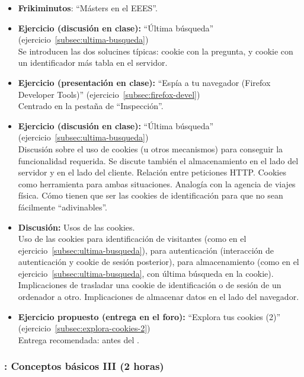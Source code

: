 \documentclass[a4paper,12pt]{article}
\begin{document}
\begin{itemize}
\item \textbf{Frikiminutos}: ``Másters en el EEES''.
\item \textbf{Ejercicio (discusión en clase):} ``Última búsqueda'' (ejercicio~\ref{subsec:ultima-busqueda}) \\
  Se introducen las dos solucines típicas: cookie con la pregunta, y cookie con un identificador más tabla en el servidor.
\item \textbf{Ejercicio (presentación en clase):} ``Espía a tu navegador (Firefox Developer Tools)'' (ejercicio~\ref{subsec:firefox-devel}) \\
  Centrado en la pestaña de ``Inspección''.
\item \textbf{Ejercicio (discusión en clase):} ``Última búsqueda'' (ejercicio~\ref{subsec:ultima-busqueda}) \\
  Discusión sobre el uso de cookies (u otros mecanismos) para conseguir la funcionalidad requerida. Se discute también el almacenamiento en el lado del servidor y en el lado del cliente. Relación entre peticiones HTTP. Cookies como herramienta para ambas situaciones. Analogía con la agencia de viajes física. Cómo tienen que ser las cookies de identificación para que no sean fácilmente ``adivinables''.
\item \textbf{Discusión:} Usos de las cookies. \\
  Uso de las cookies para identificación de visitantes (como en el ejercicio~\ref{subsec:ultima-busqueda}), para autenticación (interacción de autenticación y cookie de sesión posterior), para almacenamiento (como en el ejercicio~\ref{subsec:ultima-busqueda}, con última búsqueda en la cookie). Implicaciones de trasladar una cookie de identificación o de sesión de un ordenador a otro. Implicaciones de almacenar datos en el lado del navegador.
\item \textbf{Ejercicio propuesto (entrega en el foro):} ``Explora tus cookies (2)'' (ejercicio~\ref{subsec:explora-cookies-2}) \\
  Entrega recomendada: antes del \martesD. \\
\end{itemize}


\subsubsection{\martesD: Conceptos básicos III (2 horas)}
\label{cal:martesD}
\end{document}
